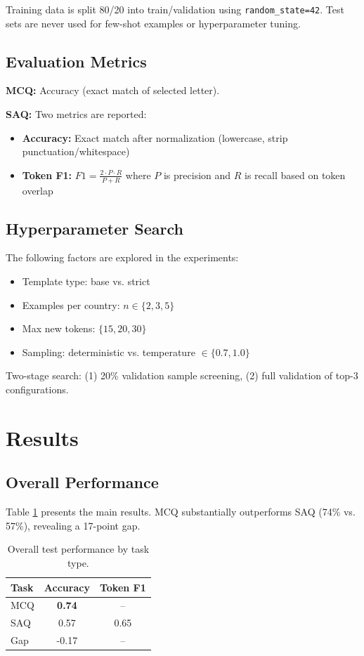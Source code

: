 \documentclass[11pt,a4paper,twocolumn]{article}
\begin{document}
Training data is split 80/20 into train/validation using \texttt{random\_state=42}. Test sets are never used for few-shot examples or hyperparameter tuning.

\subsection{Evaluation Metrics}

\textbf{MCQ:} Accuracy (exact match of selected letter).

\textbf{SAQ:} Two metrics are reported:
\begin{itemize}
\item \textbf{Accuracy:} Exact match after normalization (lowercase, strip punctuation/whitespace)
\item \textbf{Token F1:} $F1 = \frac{2 \cdot P \cdot R}{P + R}$ where $P$ is precision and $R$ is recall based on token overlap
\end{itemize}

\subsection{Hyperparameter Search}

The following factors are explored in the experiments:
\begin{itemize}
\item Template type: base vs. strict
\item Examples per country: $n \in \{2, 3, 5\}$
\item Max new tokens: $\{15, 20, 30\}$
\item Sampling: deterministic vs. temperature $\in \{0.7, 1.0\}$
\end{itemize}

Two-stage search: (1) 20\% validation sample screening, (2) full validation of top-3 configurations.

\section{Results}

\subsection{Overall Performance}

Table \ref{tab:overall_results} presents the main results. MCQ substantially outperforms SAQ (74\% vs. 57\%), revealing a 17-point gap.

\begin{table}[h]
\centering
\begin{tabular}{lcc}
\toprule
\textbf{Task} & \textbf{Accuracy} & \textbf{Token F1} \\
\midrule
MCQ & \textbf{0.74} & -- \\
SAQ & 0.57 & 0.65 \\
\midrule
Gap & {-0.17} & -- \\
\bottomrule
\end{tabular}
\caption{Overall test performance by task type.}
\label{tab:overall_results}
\end{table}
\end{document}
